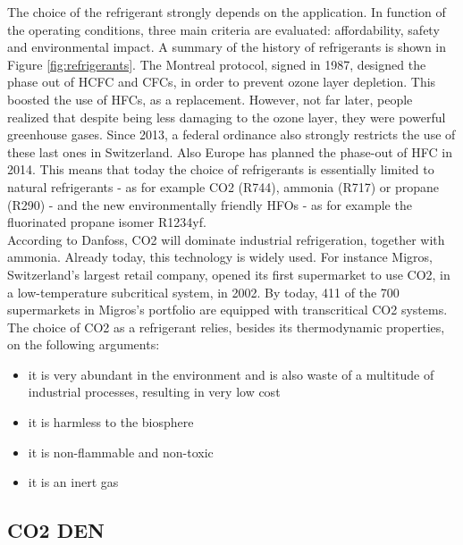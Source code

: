 \documentclass{article}
\begin{document}
The choice of the refrigerant strongly depends on the application. In function of the operating conditions, three main criteria are evaluated: affordability, safety and environmental impact.
A summary of the history of refrigerants is shown in Figure \ref{fig:refrigerants}.
The Montreal protocol, signed in 1987, designed the phase out of HCFC and CFCs, in order to prevent ozone layer depletion. This boosted the use of HFCs, as a replacement. However, not far later, people realized that despite being less damaging to the ozone layer, they were powerful greenhouse gases. Since 2013, a federal ordinance also strongly restricts the use of these last ones in Switzerland\cite{hydrocarbons21.comSwitzerlandIntroduceHFC}. Also Europe has planned the phase-out of HFC in 2014\cite{europeancommissionforclimateactionEULegislationControl2016}. This means that today the choice of refrigerants is essentially limited to natural refrigerants - as for example CO2 (R744), ammonia (R717) or propane (R290) - and the new environmentally friendly HFOs - as for example the fluorinated propane isomer R1234yf.\\
According to Danfoss\cite{danfossRefrigerantOptionsNow2017}, CO2 will dominate industrial refrigeration, together with ammonia. Already today, this technology is widely used. For instance Migros, Switzerland's largest retail company, opened its first supermarket to use CO2, in a low-temperature subcritical system, in 2002. By today, 411 of the 700 supermarkets in Migros’s portfolio are equipped with transcritical CO2 systems\cite{williamsMigrosDNA2018}.
The choice of CO2 as a refrigerant relies, besides its thermodynamic properties, on the following arguments\cite{cavalliniPROPERTIESCO2REFRIGERANT}:
\begin{itemize}
	\item it is very abundant in the environment and is also waste of a multitude of industrial processes, resulting in very low cost
	\item it is harmless to the biosphere
	\item it is non-flammable and non-toxic
	\item it is an inert gas
\end{itemize}

\subsection{CO2 DEN}
\end{document}
